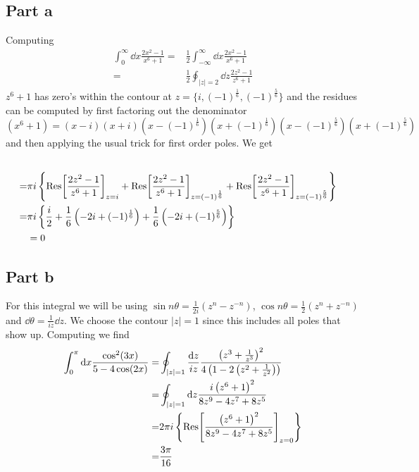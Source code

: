 \documentclass[a4paper,12pt]{article}
\begin{document}
\subsection*{Part a}
Computing
\begin{equation}
	\begin{aligned}
		\int_{0}^{\infty}\dd x\frac{2x^2-1}{x^6+1}
		=&	\frac{1}{2}\int_{-\infty}^{\infty}\dd x\frac{2x^2-1}{x^6+1}
		\\
		=&\frac{1}{2}\oint_{|z|=2} \dd z\frac{2z^2-1}{z^6+1}
	\end{aligned}
\end{equation}
$z^6+1$ has zero's within the contour at $z=\{i,(-1)^{\frac{1}{6}},(-1)^{\frac{5}{6}}\}$ and the residues can be computed by first factoring out the denominator 
\begin{equation}
(x^6+1)=(x-i)(x+i)\left(x-(-1)^{\frac{1}{6}}\right)\left(x+(-1)^{\frac{1}{6}}\right)\left(x-(-1)^{\frac{5}{6}}\right)\left(x+(-1)^{\frac{5}{6}}\right)
\end{equation}
and then applying the usual trick for first order poles. We get
\begin{equation}
\begin{aligned}
		\\
		=&\pi i
		 \left\{\Res[\frac{2z^2-1}{z^6+1}]_{z=i}+\Res[\frac{2z^2-1}{z^6+1}]_{z=(-1)^{\frac{1}{6}}}+\Res[\frac{2z^2-1}{z^6+1}]_{z=(-1)^{\frac{5}{6}}}\right\}\\
		=&\pi i \left\{\frac{i}{2}+\frac{1}{6}\left(-2i+(-1)^{\frac{1}{6}}\right)+\frac{1}{6}\left(-2i+(-1)^{\frac{5}{6}}\right)\right\}\\
		&=0
	\end{aligned}
\end{equation}

\subsection*{Part b}
For this integral we will be using $\sin n\theta =\frac{1}{2i}\left(z^n-z^{-n}\right)$, $\cos n\theta =\frac{1}{2}\left(z^n+z^{-n}\right)$ and $\dd \theta=\frac{1}{iz}\dd z$. We choose the contour $|z|=1$ since this includes all poles that show up. Computing we find
\begin{equation}
	\begin{aligned}
		\int_{0}^{\pi}\dd x\frac{\cos^2(3x)}{5-4\cos(2x)}
		=&\oint_{|z|=1}\frac{\dd z}{iz}\frac{\left(z^3+\frac{1}{z^3}\right)^2}{4 \left(1-2 \left(z^2+\frac{1}{z^2}\right)\right)}\\
		=&\oint_{|z|=1}\dd z \frac{i \left(z^6+1\right)^2}{8 z^9-4 z^7+8 z^5}\\
			=&2\pi i \left\{
			\Res[\frac{\left(z^6+1\right)^2}{8 z^9-4 z^7+8 z^5}]_{z=0}
			\right\}\\
			=&\frac{3\pi}{16}
	\end{aligned}
\end{equation}
\end{document}
